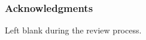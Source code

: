 \documentclass{article} %
\newcommand{\1}{\b{1}}              %
\newcommand{\0}{\b{0}}              %
\newcommand{\todo}[1]{{\color[rgb]{.6,.1,.6}{#1}}}
\begin{document}






\subsubsection*{Acknowledgments}
Left blank during the review process.



\end{document}
